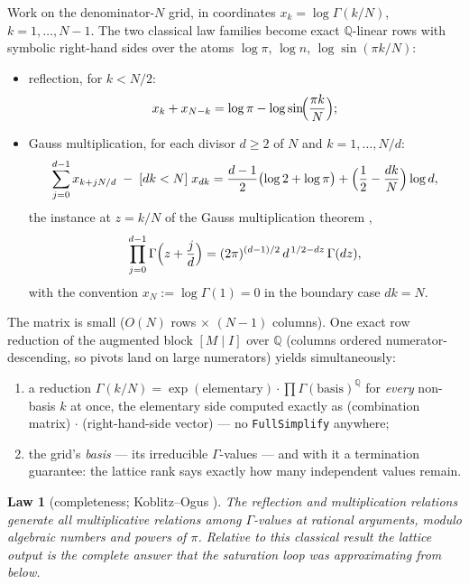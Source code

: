 \documentclass[11pt]{article}
\newtheorem{law}[result]{Law}
\theoremstyle{remark}
\begin{document}
Work on the denominator-$N$ grid, in coordinates $x_k=\log\Gamma(k/N)$, $k=1,\dots,N-1$.
The two classical law families become exact $\mathbb{Q}$-linear rows with symbolic
right-hand sides over the atoms $\log\pi$, $\log n$, $\log\sin(\pi k/N)$:
\begin{itemize}
\item reflection, for $k<N/2$:
\[
x_k+x_{N-k}=\log\pi-\log\sin\!\Bigl(\frac{\pi k}{N}\Bigr);
\]
\item Gauss multiplication, for each divisor $d\ge2$ of $N$ and $k=1,\dots,N/d$:
\[
\sum_{j=0}^{d-1}x_{k+jN/d}\;-\;[dk<N]\;x_{dk}
=\frac{d-1}{2}\bigl(\log2+\log\pi\bigr)+\Bigl(\frac12-\frac{dk}{N}\Bigr)\log d ,
\]
the instance at $z=k/N$ of the Gauss multiplication theorem \cite{Gauss},
\[
\prod_{j=0}^{d-1}\Gamma\Bigl(z+\frac{j}{d}\Bigr)=(2\pi)^{(d-1)/2}\,d^{\,1/2-dz}\,\Gamma(dz),
\]
with the convention $x_N:=\log\Gamma(1)=0$ in the boundary case $dk=N$.
\end{itemize}
The matrix is small ($O(N)$ rows $\times$ $(N-1)$ columns). One exact row reduction of the
augmented block $[M\mid I]$ over $\mathbb{Q}$ (columns ordered numerator-descending, so
pivots land on large numerators) yields simultaneously:
\begin{enumerate}
\item a reduction $\Gamma(k/N)=\exp(\text{elementary})\cdot\prod\Gamma(\text{basis})^{\mathbb{Q}}$
for \emph{every} non-basis $k$ at once, the elementary side computed exactly as
(combination matrix)$\,\cdot\,$(right-hand-side vector) --- no \texttt{FullSimplify}
anywhere;
\item the grid's \emph{basis} --- its irreducible $\Gamma$-values --- and with it a
termination guarantee: the lattice rank says exactly how many independent values remain.
\end{enumerate}

\begin{law}[completeness; Koblitz--Ogus \cite{KoblitzOgus}]\label{law:ko}
The reflection and multiplication relations generate \emph{all} multiplicative relations
among $\Gamma$-values at rational arguments, modulo algebraic numbers and powers of $\pi$.
Relative to this classical result the lattice output is the complete answer that the
saturation loop was approximating from below.
\end{law}
\end{document}
